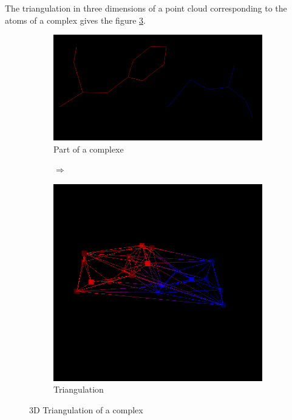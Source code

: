 The triangulation in three dimensions of a point cloud corresponding to
 the atoms of a complex gives the figure \ref{fig::delaunays_3d}.

\begin{figure}[ht]
\centering
\begin{subfigure}{0.45\textwidth}
  \centering
  \includegraphics[width=\textwidth]{figures/small_prot.png}
  \caption{Part of a complexe}
  \label{fig::small_prot}
\end{subfigure}%
\begin{subfigure}{0.1\textwidth}
  \centering
  $\Longrightarrow$
\end{subfigure}%
\begin{subfigure}{0.45\textwidth}
  \centering
  \includegraphics[width=\textwidth]{figures/3d_triangulation04.png}
  \caption{Triangulation}
  \label{fig::prot_delaunay}
\end{subfigure}
\caption{3D Triangulation of a complex}
\label{fig::delaunays_3d}
\end{figure}

